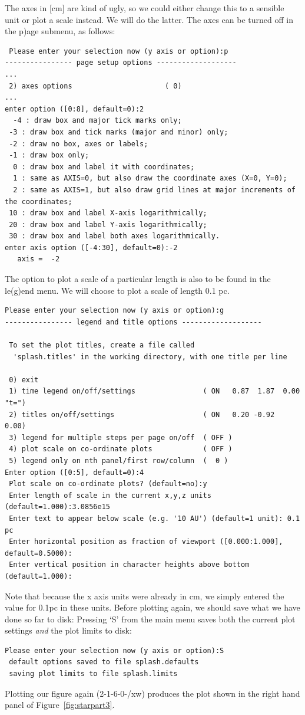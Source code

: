 \documentclass[a4paper,10pt]{article}
\begin{document}
 The axes in [cm] are kind of ugly, so we could either change this to a sensible unit or plot a scale instead. We will do the latter. The axes can be turned off in the p)age submenu, as follows:
\begin{verbatim}
 Please enter your selection now (y axis or option):p
---------------- page setup options -------------------
...
 2) axes options                      ( 0)
...
enter option ([0:8], default=0):2
  -4 : draw box and major tick marks only;
 -3 : draw box and tick marks (major and minor) only;
 -2 : draw no box, axes or labels;
 -1 : draw box only;
  0 : draw box and label it with coordinates;
  1 : same as AXIS=0, but also draw the coordinate axes (X=0, Y=0);
  2 : same as AXIS=1, but also draw grid lines at major increments of the coordinates;
 10 : draw box and label X-axis logarithmically;
 20 : draw box and label Y-axis logarithmically;
 30 : draw box and label both axes logarithmically.
enter axis option ([-4:30], default=0):-2
   axis =  -2
\end{verbatim}
The option to plot a scale of a particular length is also to be found in the le(g)end menu. We will choose to plot a scale of length 0.1 pc. 
\begin{verbatim}
Please enter your selection now (y axis or option):g
---------------- legend and title options -------------------

 To set the plot titles, create a file called
  'splash.titles' in the working directory, with one title per line

 0) exit 
 1) time legend on/off/settings                ( ON   0.87  1.87  0.00 "t=")
 2) titles on/off/settings                     ( ON   0.20 -0.92  0.00)
 3) legend for multiple steps per page on/off  ( OFF )
 4) plot scale on co-ordinate plots            ( OFF )
 5) legend only on nth panel/first row/column  (  0 )
Enter option ([0:5], default=0):4
 Plot scale on co-ordinate plots? (default=no):y
 Enter length of scale in the current x,y,z units (default=1.000):3.0856e15
 Enter text to appear below scale (e.g. '10 AU') (default=1 unit): 0.1 pc
 Enter horizontal position as fraction of viewport ([0.000:1.000], default=0.5000):
 Enter vertical position in character heights above bottom (default=1.000):
\end{verbatim}
Note that because the x axis units were already in cm, we simply entered the value for 0.1pc in these units. Before plotting again, we should save what we have done so far to disk: Pressing `S' from the main menu saves both the current plot settings \emph{and} the plot limits to disk:
\begin{verbatim}
Please enter your selection now (y axis or option):S
 default options saved to file splash.defaults
 saving plot limits to file splash.limits
\end{verbatim}
Plotting our figure again (2-1-6-0-/xw) produces the plot shown in the right hand panel of Figure~\ref{fig:starpart3}. 
\end{document}
